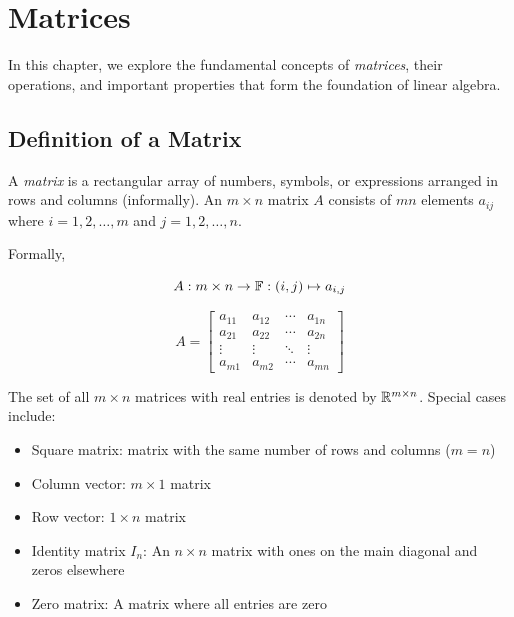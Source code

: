 \chapter{Matrices}

In this chapter, we explore the fundamental concepts of \emph{matrices}, their operations, and important properties that form the foundation of 
linear algebra.

\section{Definition of a Matrix}

A \emph{matrix} is a rectangular array of numbers, symbols, or expressions arranged in rows and columns (informally). An 
\(m \times n\) matrix \(A\) consists of \(mn\) elements \(a_{ij}\) where \(i = 1, 2, \ldots, m\) and \(j = 1, 2, \ldots, n\).

Formally, 

\[
    A: m \times n \to \mathbb{F} : (i,j) \mapsto a_{i,j}  
\]

\[
    A =
    \begin{bmatrix}
        a_{11} & a_{12} & \cdots & a_{1n} \\
        a_{21} & a_{22} & \cdots & a_{2n} \\
        \vdots & \vdots & \ddots & \vdots \\
        a_{m1} & a_{m2} & \cdots & a_{mn}
    \end{bmatrix}
\]

The set of all \(m \times n\) matrices with real entries is denoted by \(\mathbb{R}^{m \times n}\). Special cases include:

\begin{itemize}

    \item Square matrix: matrix with the same number of rows and columns (\(m = n\))

    \item Column vector: \(m \times 1\) matrix

    \item Row vector: \(1 \times n\) matrix

    \item Identity matrix \(I_n\): An \(n \times n\) matrix with ones on the main diagonal and zeros elsewhere

    \item Zero matrix: A matrix where all entries are zero

\end{itemize}

